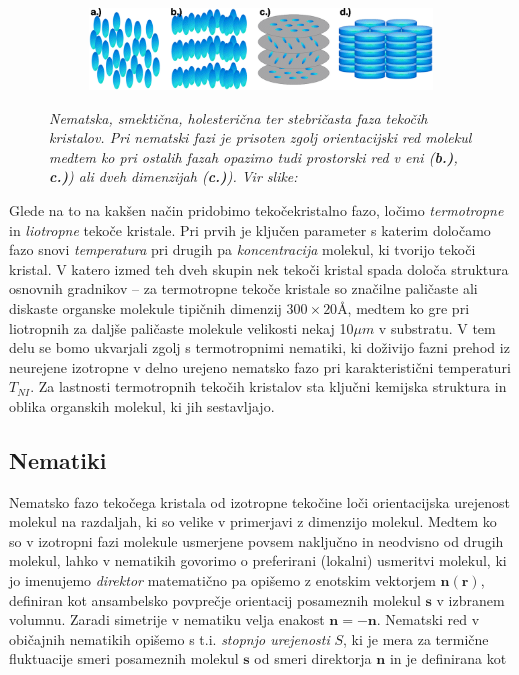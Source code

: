 \documentclass[longbibliography,slovene,a4paper,12pt]{book}
\begin{document}
\begin{figure}[h!]
	\centering
	\begin{subfigure}[b]{0.9\textwidth}
	\includegraphics[width=\textwidth]{slike/lc.png}
	\end{subfigure}
	\caption{\emph{Nematska, smektična, holesterična ter stebričasta faza tekočih kristalov. Pri nematski fazi je prisoten zgolj orientacijski red molekul medtem ko pri ostalih fazah opazimo tudi prostorski red v eni (\textbf{b.)}, \textbf{c.)}) ali dveh dimenzijah (\textbf{c.)}). Vir slike:\cite{liquidcrystaltypes}}}
	\label{fig:liquidcrystaltypes}
\end{figure}
Glede na to na kakšen način pridobimo tekočekristalno fazo, ločimo \emph{termotropne} in \emph{liotropne} tekoče kristale. Pri prvih je ključen parameter s katerim določamo fazo snovi \emph{temperatura} pri drugih pa \emph{koncentracija} molekul, ki tvorijo tekoči kristal. V katero izmed teh dveh skupin nek tekoči kristal spada določa struktura osnovnih gradnikov -- za termotropne tekoče kristale so značilne paličaste ali diskaste organske molekule tipičnih dimenzij $300 \times 20$Å,  medtem ko gre pri liotropnih za daljše paličaste molekule velikosti nekaj 10$\mu m$ v substratu. V tem delu se bomo ukvarjali zgolj s termotropnimi nematiki, ki doživijo fazni prehod iz neurejene izotropne v delno urejeno nematsko fazo pri karakteristični temperaturi $T_{NI}$. Za lastnosti termotropnih tekočih kristalov sta ključni kemijska struktura in oblika organskih molekul, ki jih sestavljajo\cite{degennes}. 

\subsection{Nematiki}
 
Nematsko fazo tekočega kristala od izotropne tekočine loči orientacijska urejenost molekul na razdaljah, ki so velike v primerjavi z dimenzijo molekul. Medtem ko so v izotropni fazi molekule usmerjene povsem naključno in neodvisno od drugih molekul, lahko v nematikih govorimo o preferirani (lokalni) usmeritvi molekul, ki jo imenujemo \emph{direktor} matematično pa opišemo z enotskim vektorjem $\mathbf{n}(\mathbf{r})$, definiran kot ansambelsko povprečje orientacij posameznih molekul $\mathbf{s}$ v izbranem volumnu. Zaradi simetrije v nematiku velja enakost $\mathbf{n} = -\mathbf{n}$. Nematski red v običajnih nematikih opišemo s t.i. \emph{stopnjo urejenosti} $S$, ki je mera za termične fluktuacije smeri posameznih molekul $\mathbf{s}$ od smeri direktorja $\mathbf{n}$ in je definirana kot 
\end{document}

